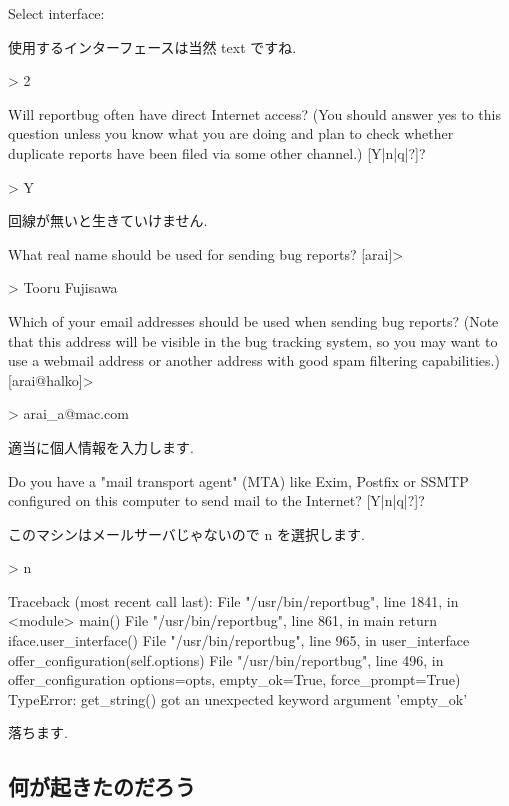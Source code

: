 \documentclass[mingoth,a4paper]{jsarticle}
\begin{document}
\begin{commandline}
\begin{commandline}
Select interface: 
\end{commandline}

使用するインターフェースは当然 text ですね.

\begin{commandline}
> 2

Will reportbug often have direct Internet access? (You should answer yes to
this question unless you know what you are doing and plan to check whether
duplicate reports have been filed via some other channel.) [Y|n|q|?]? 

> Y
\end{commandline}

回線が無いと生きていけません.

\begin{commandline}
What real name should be used for sending bug reports?
[arai]> 

> Tooru Fujisawa

Which of your email addresses should be used when sending bug reports? (Note
that this address will be visible in the bug tracking system, so you may want
to use a webmail address or another address with good spam filtering
capabilities.)
[arai@halko]> 

> arai_a@mac.com
\end{commandline}

適当に個人情報を入力します.

\begin{commandline}
Do you have a "mail transport agent" (MTA) like Exim, Postfix or SSMTP
configured on this computer to send mail to the Internet? [Y|n|q|?]? 
\end{commandline}

このマシンはメールサーバじゃないので n を選択します.

\begin{commandline}
> n

Traceback (most recent call last):
  File "/usr/bin/reportbug", line 1841, in <module>
    main()
  File "/usr/bin/reportbug", line 861, in main
    return iface.user_interface()
  File "/usr/bin/reportbug", line 965, in user_interface
    offer_configuration(self.options)
  File "/usr/bin/reportbug", line 496, in offer_configuration
    options=opts, empty_ok=True, force_prompt=True)
TypeError: get_string() got an unexpected keyword argument 'empty_ok'
\end{commandline}

落ちます.

\subsection{何が起きたのだろう}


\end{commandline}
\end{document}
